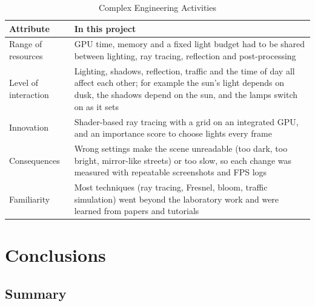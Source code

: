 \documentclass[12pt, a4paper]{report}
\begin{document}
\begin{table}[!htbp]
  \caption{Complex Engineering Activities}
  \label{tab:6.2}
  \centering
  {\fontsize{10}{13}\selectfont
    \begin{tabular}{|p{1.4in}|p{4.0in}|}
      \hline
      \textbf{Attribute} & \textbf{In this project} \\
      \hline
      Range of resources & GPU time, memory and a fixed light budget had to be shared between lighting, ray tracing, reflection and post-processing \\
      \hline
      Level of interaction & Lighting, shadows, reflection, traffic and the time of day all affect each other; for example the sun's light depends on dusk, the shadows depend on the sun, and the lamps switch on as it sets \\
      \hline
      Innovation & Shader-based ray tracing with a grid on an integrated GPU, and an importance score to choose lights every frame \\
      \hline
      Consequences & Wrong settings make the scene unreadable (too dark, too bright, mirror-like streets) or too slow, so each change was measured with repeatable screenshots and FPS logs \\
      \hline
      Familiarity & Most techniques (ray tracing, Fresnel, bloom, traffic simulation) went beyond the laboratory work and were learned from papers and tutorials \\
      \hline
    \end{tabular}
  }
\end{table}

\chapter{Conclusions}

\section{Summary}
\end{document}
